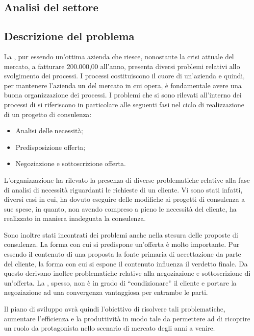 \subsection{Analisi del settore}
\subsection{Descrizione del problema}

La \customer , pur essendo un'ottima azienda che riesce, nonostante la crisi attuale del mercato, a fatturare  200.000,00 \text{\euro} all'anno, presenta diversi problemi relativi allo svolgimento dei processi.
I processi costituiscono il cuore di un'azienda e quindi, per mantenere l'azienda un  del mercato in cui opera, è fondamentale avere una buona organizzazione dei processi.
I problemi che si sono rilevati all'interno dei processi di \customer si riferiscono in particolare alle seguenti fasi nel ciclo di realizzazione di un progetto di consulenza:
\begin{itemize}
	\item Analisi delle necessità;
	\item Predisposizione offerta;
	\item Negoziazione e sottoscrizione offerta.
\end{itemize}


L'organizzazione ha rilevato la presenza di diverse problematiche relative alla fase di analisi di necessità riguardanti le richieste di un cliente. Vi sono stati infatti, diversi casi in cui, \customer  ha dovuto eseguire delle modifiche ai progetti di consulenza a sue spese, in quanto, non avendo compreso a pieno le necessità del cliente, ha  realizzato in maniera inadeguata la consulenza. 

Sono inoltre stati incontrati dei problemi anche nella stesura delle proposte di consulenza. La forma con cui si predispone un'offerta è molto importante. Pur essendo il contenuto di una proposta la fonte primaria di accettazione da parte del cliente, la forma con cui si espone il contenuto influenza il verdetto finale.
Da questo derivano inoltre problematiche relative alla negoziazione e sottoscrizione di un'offerta. La \customer , spesso, non è in grado di ``condizionare'' il cliente e portare la negoziazione ad una convergenza vantaggiosa per entrambe le parti.




Il piano di sviluppo avrà quindi l'obiettivo di risolvere tali problematiche, aumentare l'efficienza e la produttività in modo tale da permettere ad \customer di ricoprire un ruolo da protagonista nello scenario di mercato degli anni a venire.










